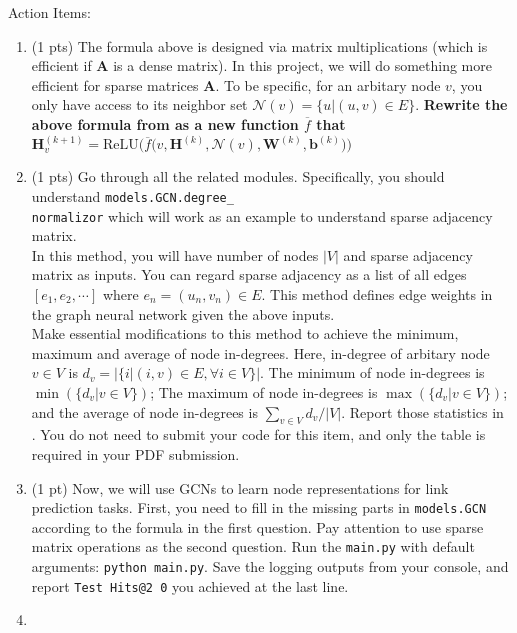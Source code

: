 \documentclass{article}
\newcommand{\mA}{\bm{A}}
\newcommand{\mH}{\bm{H}}
\newcommand{\mW}{\bm{W}}
\newcommand{\vb}{\bm{b}}
\begin{document}
%
\hfill

%
\noindent Action Items:
%
\begin{enumerate}
%
\item
    (1 pts)
    The formula above is designed via matrix multiplications (which is efficient if $\mA$
    is a dense matrix).
    In this project, we will do something more efficient for sparse matrices $\mA$.
    To be specific, for an arbitary node $v$, you only have access to its
    neighbor set $\mathcal{N}(v) = \{u | (u, v) \in E \}$.
    \textbf{%
        Rewrite the above formula from  as a new function
        $\overline{f}$ that $\mH^{(k + 1)}_{v} = \text{ReLU}\big( \overline{f}
        \big( v, \mH^{(k)}, \mathcal{N}(v), \mW^{(k)}, \vb^{(k)}\big) \big)$
    }
%
\item
(1 pts)
Go through all the related modules.
%
Specifically, you should understand \texttt{models.GCN.degree\_}\\\texttt{normalizor}
which will work as an example to understand sparse adjacency matrix.
\\
In this method, you will have number of nodes $|V|$ and sparse adjacency
matrix as inputs.
You can regard sparse adjacency as a list of all edges $[e_{1}, e_{2},
\cdots]$ where $e_{n} = (u_n, v_n) \in E$.
This method defines edge weights in the graph neural network given the above inputs.
\\
Make essential modifications to this method to achieve the minimum, maximum
and average of node in-degrees.
Here, in-degree of arbitary node $v \in V$ is $d_{v} = |\{i | (i, v) \in E,
\forall i \in V\}|$.
The minimum of node in-degrees is $\min(\{d_{v} | v \in V\})$; The maximum
of node in-degrees is $\max(\{d_{v} | v \in V\})$; and the average of node
in-degrees is $\sum_{v \in V} d_{v} / |V|$.
Report those statistics in .
You do not need to submit your code for this item, and only the table
is required in your PDF submission.
%
\item
    (1 pt)
    Now, we will use GCNs to learn node representations for link prediction
    tasks.
    First, you need to fill in the missing parts in \texttt{models.GCN}
    according to the formula in the first question.
    Pay attention to use sparse matrix operations as the second question.
    Run the \texttt{main.py} with default arguments: \verb|python main.py|.
    Save the logging outputs from your console, and report \texttt{Test Hits@2%
    0} you achieved at the last line.
%
\item

\end{enumerate}
\end{document}
